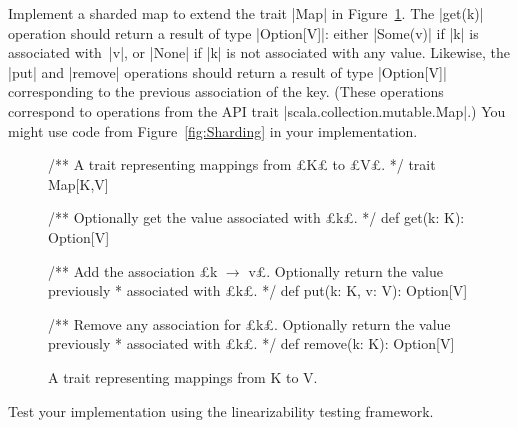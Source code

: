 \begin{questionS}
\label{ex:sharded-map}
Implement a sharded map to extend the trait |Map| in
Figure~\ref{fig:Map-trait}.  The |get(k)| operation should return a result of
type |Option[V]|: either |Some(v)| if |k| is associated with~|v|, or |None| if
|k| is not associated with any value.  Likewise, the |put| and |remove|
operations should return a result of type |Option[V]| corresponding to the
previous association of the key.  (These operations correspond to operations
from the API trait |scala.collection.mutable.Map|.)  You might use code from
Figure~\ref{fig:Sharding} in your implementation.


\begin{figure}
\begin{scala}
/** A trait representing mappings from £K£ to £V£. */
trait Map[K,V]{
  /** Optionally get the value associated with £k£. */
  def get(k: K): Option[V] 

  /** Add the association £k $\rightarrow$ v£.  Optionally return the value previously
    * associated with £k£. */
  def put(k: K, v: V): Option[V] 

  /** Remove any association for £k£.  Optionally return the value previously
    * associated with £k£. */
  def remove(k: K): Option[V] 
}
\end{scala}
\caption{A trait representing mappings from {\scalashape K} to {\scalashape
    V}.}
\label{fig:Map-trait}
\end{figure}


Test your implementation using the linearizability testing framework.
\end{questionS}


